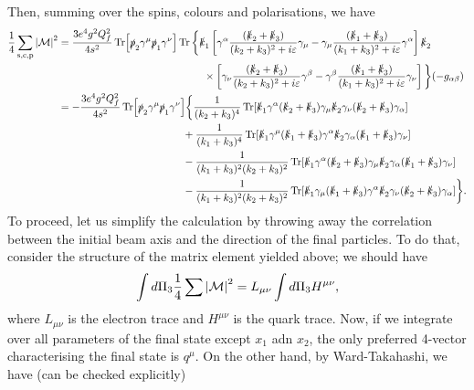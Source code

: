 \documentclass[11pt]{article}
\theoremstyle{definition}
\begin{document}
Then, summing over the spins, colours and polarisations, we have
\begin{equation}
    \begin{aligned}
        \frac{1}{4}\sum_\text{s,c,p}\abs{\mathcal{M}}^2 &= \frac{3e^4g^2Q_f^2}{4s^2}\Tr[\slashed{p}_2\gamma^\mu\slashed{p}_1\gamma^\nu]\Tr\bigg\{\slashed{k}_1\left[\gamma^\alpha\frac{(\slashed{k}_2 + \slashed{k}_3)}{(k_2+k_3)^2+ i\varepsilon}\gamma_\mu - \gamma_\mu\frac{(\slashed{k}_1 + \slashed{k}_3)}{(k_1+k_3)^2+ i\varepsilon}\gamma^\alpha \right]\slashed{k}_2\\
        &\qquad \qquad \qquad \qquad \qquad \qquad \qquad    \times\left[\gamma_\nu\frac{(\slashed{k}_2 + \slashed{k}_3)}{(k_2+k_3)^2+ i\varepsilon}\gamma^\beta - \gamma^\beta\frac{(\slashed{k}_1 + \slashed{k}_3)}{(k_1+k_3)^2+ i\varepsilon}\gamma_\nu \right]\bigg\}(-g_{\alpha\beta})\\
        &= -\frac{3e^4g^2Q_f^2}{4s^2}\Tr[\slashed{p}_2\gamma^\mu\slashed{p}_1\gamma^\nu]\bigg\{  \frac{1}{(k_2+k_3)^4}\Tr[\slashed{k}_1\gamma^\alpha(\slashed{k}_2 + \slashed{k}_3)\gamma_\mu\slashed{k}_2\gamma_\nu(\slashed{k}_2 + \slashed{k}_3)\gamma_\alpha]\\
        &\qquad \qquad \qquad \qquad \qquad \qquad+ \frac{1}{(k_1+k_3)^4}\Tr[\slashed{k}_1\gamma^\mu(\slashed{k}_1 + \slashed{k}_3)\gamma^\alpha\slashed{k}_2\gamma_\alpha(\slashed{k}_1 + \slashed{k}_3)\gamma_\nu]\\
        &\qquad \qquad \qquad \qquad \qquad \qquad- \frac{1}{(k_1+k_3)^2(k_2+k_3)^2}\Tr[\slashed{k}_1\gamma^\alpha(\slashed{k}_2 + \slashed{k}_3)\gamma_\mu\slashed{k}_2\gamma_\alpha(\slashed{k}_1 + \slashed{k}_3)\gamma_\nu]\\
        &\qquad \qquad \qquad \qquad \qquad \qquad - \frac{1}{(k_1+k_3)^2(k_2+k_3)^2}\Tr[\slashed{k}_1\gamma_\mu(\slashed{k}_1 + \slashed{k}_3)\gamma^\alpha\slashed{k}_2\gamma_\nu(\slashed{k}_2 + \slashed{k}_3)\gamma_\alpha]\bigg\}.
    \end{aligned}
\end{equation}
To proceed, let us simplify the calculation by throwing away the correlation between the initial beam axis and the direction of the final particles. To do that, consider the structure of the matrix element yielded above; we should have
\begin{equation}
    \int d\Pi_3 \frac{1}{4}\sum \abs{\mathcal{M}}^2 = L_{\mu\nu}\int d\Pi_3 H^{\mu\nu},
\end{equation}
where $L_{\mu\nu}$ is the electron trace and $H^{\mu\nu}$ is the quark trace. Now, if we integrate over all parameters of the final state except $x_1$ adn $x_2$, the only preferred 4-vector characterising the final state is $q^\mu.$ On the other hand, by Ward-Takahashi, we have (can be checked explicitly)
\end{document}
